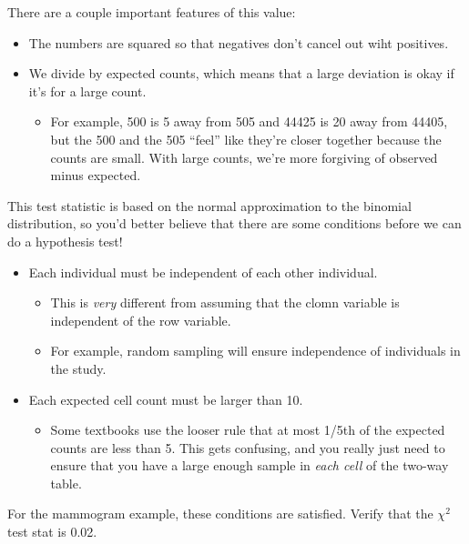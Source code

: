 \documentclass[
  letterpaper,
  DIV=11,
  numbers=noendperiod]{scrreprt}
\providecommand{\tightlist}{%
  \setlength{\itemsep}{0pt}\setlength{\parskip}{0pt}}\usepackage{longtable,booktabs,array}
\begin{document}
There are a couple important features of this value:

\begin{itemize}
\tightlist
\item
  The numbers are squared so that negatives don't cancel out wiht
  positives.
\item
  We divide by expected counts, which means that a large deviation is
  okay if it's for a large count.

  \begin{itemize}
  \tightlist
  \item
    For example, 500 is 5 away from 505 and 44425 is 20 away from 44405,
    but the 500 and the 505 ``feel'' like they're closer together
    because the counts are small. With large counts, we're more
    forgiving of observed minus expected.
  \end{itemize}
\end{itemize}

This test statistic is based on the normal approximation to the binomial
distribution, so you'd better believe that there are some conditions
before we can do a hypothesis test!

\begin{itemize}
\tightlist
\item
  Each individual must be independent of each other individual.

  \begin{itemize}
  \tightlist
  \item
    This is \emph{very} different from assuming that the clomn variable
    is independent of the row variable.
  \item
    For example, random sampling will ensure independence of individuals
    in the study.
  \end{itemize}
\item
  Each expected cell count must be larger than 10.

  \begin{itemize}
  \tightlist
  \item
    Some textbooks use the looser rule that at most 1/5th of the
    expected counts are less than 5. This gets confusing, and you really
    just need to ensure that you have a large enough sample in
    \emph{each cell} of the two-way table.
  \end{itemize}
\end{itemize}

For the mammogram example, these conditions are satisfied. Verify that
the \(\chi^2\) test stat is 0.02.
\end{document}
